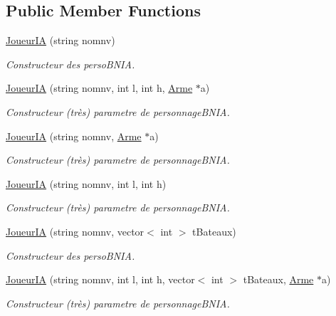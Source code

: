 \subsection*{Public Member Functions}
\begin{DoxyCompactItemize}
\item 
\hyperlink{classJoueurIA_a95ee959f123d5edc3aa4ec00a0419b0d}{Joueur\-I\-A} (string nomnv)
\begin{DoxyCompactList}\small\item\em Constructeur des perso\-B\-N\-I\-A. \end{DoxyCompactList}\item 
\hyperlink{classJoueurIA_a2ade22afbf5d6a16f31c19c2854b89d8}{Joueur\-I\-A} (string nomnv, int l, int h, \hyperlink{classArme}{Arme} $\ast$a)
\begin{DoxyCompactList}\small\item\em Constructeur (très) parametre de personnage\-B\-N\-I\-A. \end{DoxyCompactList}\item 
\hyperlink{classJoueurIA_a2ce9a7329cac275748d069c68b81b042}{Joueur\-I\-A} (string nomnv, \hyperlink{classArme}{Arme} $\ast$a)
\begin{DoxyCompactList}\small\item\em Constructeur (très) parametre de personnage\-B\-N\-I\-A. \end{DoxyCompactList}\item 
\hyperlink{classJoueurIA_acd72db6b7768b7ae7edfba843f0b5ea9}{Joueur\-I\-A} (string nomnv, int l, int h)
\begin{DoxyCompactList}\small\item\em Constructeur (très) parametre de personnage\-B\-N\-I\-A. \end{DoxyCompactList}\item 
\hyperlink{classJoueurIA_a169acc5a53a751f182ff4605d63a8f20}{Joueur\-I\-A} (string nomnv, vector$<$ int $>$ t\-Bateaux)
\begin{DoxyCompactList}\small\item\em Constructeur des perso\-B\-N\-I\-A. \end{DoxyCompactList}\item 
\hyperlink{classJoueurIA_a6524d958b7e2739f7758be25bbf721d5}{Joueur\-I\-A} (string nomnv, int l, int h, vector$<$ int $>$ t\-Bateaux, \hyperlink{classArme}{Arme} $\ast$a)
\begin{DoxyCompactList}\small\item\em Constructeur (très) parametre de personnage\-B\-N\-I\-A. \end{DoxyCompactList}\item 

\end{DoxyCompactItemize}
